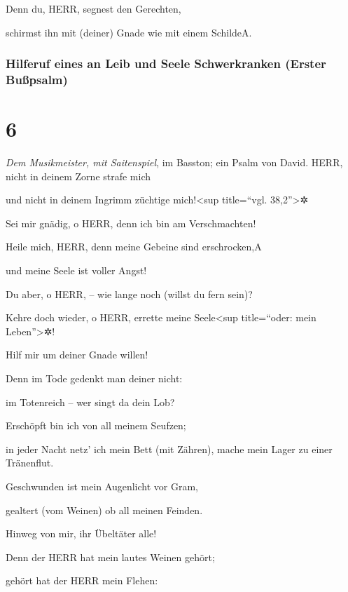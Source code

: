 Denn du, HERR, segnest den Gerechten,

schirmst ihn mit (deiner) Gnade wie mit einem Schilde{A}.

\hypertarget{hilferuf-eines-an-leib-und-seele-schwerkranken-erster-buuxdfpsalm}{%
\subsubsection{Hilferuf eines an Leib und Seele Schwerkranken (Erster
Bußpsalm)}\label{hilferuf-eines-an-leib-und-seele-schwerkranken-erster-buuxdfpsalm}}

\hypertarget{section-5}{%
\section{6}\label{section-5}}

\emph{Dem Musikmeister, mit Saitenspiel}, im Basston; ein
Psalm von David. HERR, nicht in deinem Zorne strafe mich

und nicht in deinem Ingrimm züchtige mich!\textless sup title=``vgl.
38,2''\textgreater✲

Sei mir gnädig, o HERR, denn ich bin am Verschmachten!

Heile mich, HERR, denn meine Gebeine sind erschrocken,{A}

und meine Seele ist voller Angst!

Du aber, o HERR, -- wie lange noch (willst du fern sein)?

Kehre doch wieder, o HERR, errette meine
Seele\textless sup title=``oder: mein Leben''\textgreater✲!

Hilf mir um deiner Gnade willen!

Denn im Tode gedenkt man deiner nicht:

im Totenreich -- wer singt da dein Lob?

Erschöpft bin ich von all meinem Seufzen;

in jeder Nacht netz' ich mein Bett (mit Zähren), mache mein Lager zu
einer Tränenflut.

Geschwunden ist mein Augenlicht vor Gram,

gealtert (vom Weinen) ob all meinen Feinden.

Hinweg von mir, ihr Übeltäter alle!

Denn der HERR hat mein lautes Weinen gehört;

gehört hat der HERR mein Flehen:

